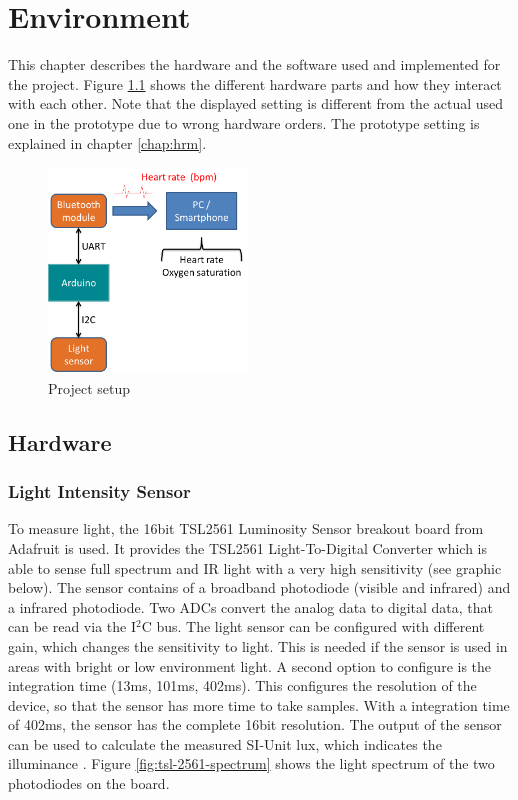 \documentclass[notitlepage]{scrreprt}
\begin{document}
\chapter{Environment}
\label{chap:environment}
This chapter describes the hardware and the software used and implemented for the project. Figure \ref{fig:data-flow} shows the different hardware parts and how they interact with each other. Note that the displayed setting is different from the actual used one in the prototype due to wrong hardware orders. The prototype setting is explained in chapter \ref{chap:hrm}.

\begin{figure}[H]
	\centering
	\includegraphics[width=200px]{images/general_dataFlow.png}
	\caption{Project setup}
	\label{fig:data-flow}
\end{figure}

\section{Hardware}
\subsection{Light Intensity Sensor}
To measure light, the 16bit TSL2561 Luminosity Sensor breakout board from Adafruit is used. It provides the TSL2561 Light-To-Digital Converter which is able to sense full spectrum and IR light with a very high sensitivity (see graphic below). The sensor contains of a broadband photodiode (visible and infrared) and a infrared photodiode. Two ADCs convert the analog data to digital data, that can be read via the I$^{2}$C bus. The light sensor can be configured with different gain, which changes the sensitivity to light. This is needed if the sensor is used in areas with bright or low environment light. A second option to configure is the integration time (13ms, 101ms, 402ms). This configures the resolution of the device, so that the sensor has more time to take samples. With a integration time of 402ms, the sensor has the complete 16bit resolution. The output of the sensor can be used to calculate the measured SI-Unit lux, which indicates the illuminance \cite{bib:tsl-sensor}. Figure \ref{fig:tsl-2561-spectrum} shows the light spectrum of the two photodiodes on the board.
\end{document}
